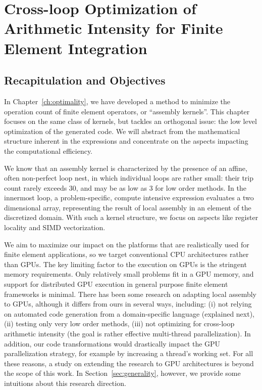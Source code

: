\chapter{Cross-loop Optimization of Arithmetic Intensity for Finite Element Integration}
\label{ch:lowlevelopt}

\section{Recapitulation and Objectives}
In Chapter~\ref{ch:optimality}, we have developed a method to minimize the operation count of finite element operators, or ``assembly kernels''. This chapter focuses on the same class of kernels, but tackles an orthogonal issue: the low level optimization of the generated code. We will abstract from the mathematical structure inherent in the expressions and concentrate on the aspects impacting the computational efficiency.

We know that an assembly kernel is characterized by the presence of an affine, often non-perfect loop nest, in which individual loops are rather small: their trip count rarely exceeds 30, and may be as low as 3 for low order methods. In the innermost loop, a problem-specific, compute intensive expression evaluates a two dimensional array, representing the result of local assembly in an element of the discretized domain. With such a kernel structure, we focus on aspects like register locality and SIMD vectorization.

We aim to maximize our impact on the platforms that are realistically used for finite element applications, so we target conventional CPU architectures rather than GPUs. The key limiting factor to the execution on GPUs is the stringent memory requirements. Only relatively small problems fit in a GPU memory, and support for distributed GPU execution in general purpose finite element frameworks is minimal. There has been some research on adapting local assembly to GPUs, although it differs from ours in several ways, including: (i) not relying on automated code generation from a domain-specific language (explained next), (ii) testing only very low order methods, (iii) not optimizing for cross-loop arithmetic intensity (the goal is rather effective multi-thread parallelization). In addition, our code transformations would drastically impact the GPU parallelization strategy, for example by increasing a thread's working set. For all these reasons, a study on extending the research to GPU architectures is beyond the scope of this work. In Section~\ref{sec:generality}, however, we provide some intuitions about this research direction.

